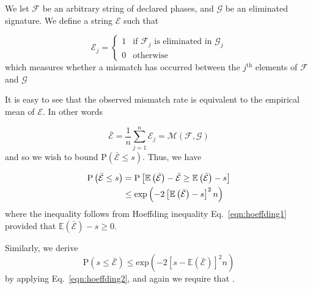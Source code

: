 We let $\mathcal{F}$ be an arbitrary string of declared phases, and $\mathcal{G}$ be an eliminated signature. We define a string $\mathcal{E}$ such that

\begin{equation*}\label{eqn:error}
\mathcal{E}_j = 
\begin{cases}
1 & \text{if $\mathcal{F}_j$ is eliminated in $\mathcal{G}_j$} \\
0 & \text{otherwise}
\end{cases}
\end{equation*}
which measures whether a mismatch has occurred between the $j^\text{th}$ elements of $\mathcal{F}$ and $\mathcal{G}$ %

It is easy to see that the observed mismatch rate is equivalent to the empirical mean of $\mathcal{E}$. In other words

\begin{equation}
\bar{\mathcal{E}} = \frac{1}{n} \sum_{j=1}^n \mathcal{E}_j = \mathcal{M}\left(\mathcal{F}, \mathcal{G}\right)
\end{equation}
and so we wish to bound $\text{P}\left(\bar{\mathcal{E}} \le s\right)$. Thus, we have

\begin{align}\label{eqn:qds_hoeffding1}
\text{P}\left(\bar{\mathcal{E}} \le s \right) &= \text{P}\left[\mathbb{E}\left(\bar{\mathcal{E}}\right) - \bar{\mathcal{E}} \ge \mathbb{E}\left(\bar{\mathcal{E}}\right) - s\right] \notag \\
&\le \text{exp}\left(- 2 \left[\mathbb{E}\left(\bar{\mathcal{E}}\right) - s\right]^2 n \right)
\end{align}
where the inequality follows from Hoeffding inequality Eq.~\ref{eqn:hoeffding1} provided that $\mathbb{E}\left(\bar{\mathcal{E}}\right) - s \ge 0$.

Similarly, we derive
\begin{equation}\label{eqn:qds_hoeffding2}
\text{P}\left(s \le \bar{\mathcal{E}}\right) \le \text{exp}\left( - 2 \left[s - \mathbb{E}\left(\bar{\mathcal{E}}\right)\right]^2 n\right)
\end{equation}
by applying Eq.~\ref{eqn:hoeffding2}, and again we require that .

